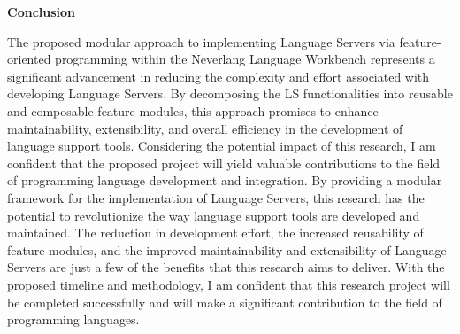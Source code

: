\hfill \break
\noindent
\textbf{Conclusion}

The proposed modular approach to implementing Language Servers via feature-oriented programming within the Neverlang Language Workbench represents a significant advancement in reducing the complexity and effort associated with developing Language Servers. By decomposing the LS functionalities into reusable and composable feature modules, this approach promises to enhance maintainability, extensibility, and overall efficiency in the development of language support tools.
Considering the potential impact of this research, I am confident that the proposed project will yield valuable contributions to the field of programming language development and integration. By providing a modular framework for the implementation of Language Servers, this research has the potential to revolutionize the way language support tools are developed and maintained. The reduction in development effort, the increased reusability of feature modules, and the improved maintainability and extensibility of Language Servers are just a few of the benefits that this research aims to deliver. With the proposed timeline and methodology, I am confident that this research project will be completed successfully and will make a significant contribution to the field of programming languages.
